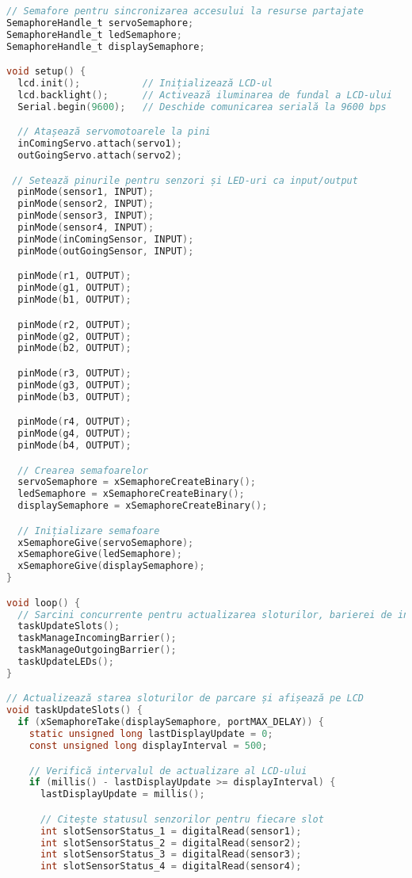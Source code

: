 \documentclass[a4paper,11pt]{report}
\begin{document}
\begin{lstlisting}[language=C]
// Semafore pentru sincronizarea accesului la resurse partajate
SemaphoreHandle_t servoSemaphore;
SemaphoreHandle_t ledSemaphore;
SemaphoreHandle_t displaySemaphore;

void setup() {
  lcd.init();           // Inițializează LCD-ul
  lcd.backlight();      // Activează iluminarea de fundal a LCD-ului
  Serial.begin(9600);   // Deschide comunicarea serială la 9600 bps

  // Atașează servomotoarele la pini
  inComingServo.attach(servo1);
  outGoingServo.attach(servo2);

 // Setează pinurile pentru senzori și LED-uri ca input/output
  pinMode(sensor1, INPUT);
  pinMode(sensor2, INPUT);
  pinMode(sensor3, INPUT);
  pinMode(sensor4, INPUT);
  pinMode(inComingSensor, INPUT);
  pinMode(outGoingSensor, INPUT);

  pinMode(r1, OUTPUT);
  pinMode(g1, OUTPUT);
  pinMode(b1, OUTPUT);

  pinMode(r2, OUTPUT);
  pinMode(g2, OUTPUT);
  pinMode(b2, OUTPUT);

  pinMode(r3, OUTPUT);
  pinMode(g3, OUTPUT);
  pinMode(b3, OUTPUT);

  pinMode(r4, OUTPUT);
  pinMode(g4, OUTPUT);
  pinMode(b4, OUTPUT);

  // Crearea semafoarelor
  servoSemaphore = xSemaphoreCreateBinary();
  ledSemaphore = xSemaphoreCreateBinary();
  displaySemaphore = xSemaphoreCreateBinary();

  // Inițializare semafoare
  xSemaphoreGive(servoSemaphore);
  xSemaphoreGive(ledSemaphore);
  xSemaphoreGive(displaySemaphore);
}

void loop() {
  // Sarcini concurrente pentru actualizarea sloturilor, barierei de intrare/ieșire și LED-urilor
  taskUpdateSlots();
  taskManageIncomingBarrier();
  taskManageOutgoingBarrier();
  taskUpdateLEDs();
}

// Actualizează starea sloturilor de parcare și afișează pe LCD
void taskUpdateSlots() {
  if (xSemaphoreTake(displaySemaphore, portMAX_DELAY)) {
    static unsigned long lastDisplayUpdate = 0;
    const unsigned long displayInterval = 500;

    // Verifică intervalul de actualizare al LCD-ului
    if (millis() - lastDisplayUpdate >= displayInterval) {
      lastDisplayUpdate = millis();

      // Citește statusul senzorilor pentru fiecare slot
      int slotSensorStatus_1 = digitalRead(sensor1);
      int slotSensorStatus_2 = digitalRead(sensor2);
      int slotSensorStatus_3 = digitalRead(sensor3);
      int slotSensorStatus_4 = digitalRead(sensor4);


\end{lstlisting}
\end{document}

